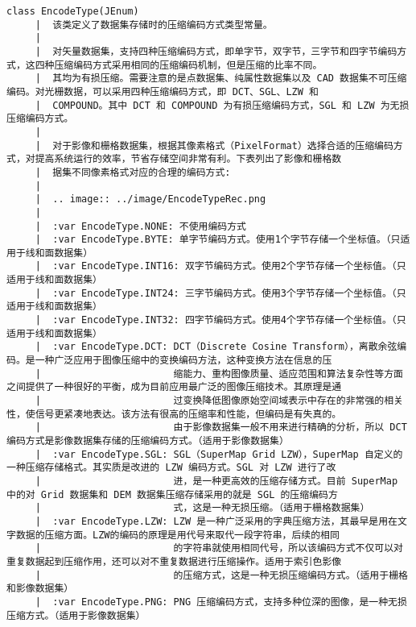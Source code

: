 \documentclass[11pt]{article}
\begin{document}
\begin{Verbatim}[commandchars=\\\{\}]
    class EncodeType(JEnum)
     |  该类定义了数据集存储时的压缩编码方式类型常量。
     |  
     |  对矢量数据集，支持四种压缩编码方式，即单字节，双字节，三字节和四字节编码方式，这四种压缩编码方式采用相同的压缩编码机制，但是压缩的比率不同。
     |  其均为有损压缩。需要注意的是点数据集、纯属性数据集以及 CAD 数据集不可压缩编码。对光栅数据，可以采用四种压缩编码方式，即 DCT、SGL、LZW 和
     |  COMPOUND。其中 DCT 和 COMPOUND 为有损压缩编码方式，SGL 和 LZW 为无损压缩编码方式。
     |  
     |  对于影像和栅格数据集，根据其像素格式（PixelFormat）选择合适的压缩编码方式，对提高系统运行的效率，节省存储空间非常有利。下表列出了影像和栅格数
     |  据集不同像素格式对应的合理的编码方式:
     |  
     |  .. image:: ../image/EncodeTypeRec.png
     |  
     |  :var EncodeType.NONE: 不使用编码方式
     |  :var EncodeType.BYTE: 单字节编码方式。使用1个字节存储一个坐标值。（只适用于线和面数据集）
     |  :var EncodeType.INT16: 双字节编码方式。使用2个字节存储一个坐标值。（只适用于线和面数据集）
     |  :var EncodeType.INT24: 三字节编码方式。使用3个字节存储一个坐标值。（只适用于线和面数据集）
     |  :var EncodeType.INT32: 四字节编码方式。使用4个字节存储一个坐标值。（只适用于线和面数据集）
     |  :var EncodeType.DCT: DCT（Discrete Cosine Transform），离散余弦编码。是一种广泛应用于图像压缩中的变换编码方法，这种变换方法在信息的压
     |                       缩能力、重构图像质量、适应范围和算法复杂性等方面之间提供了一种很好的平衡，成为目前应用最广泛的图像压缩技术。其原理是通
     |                       过变换降低图像原始空间域表示中存在的非常强的相关性，使信号更紧凑地表达。该方法有很高的压缩率和性能，但编码是有失真的。
     |                       由于影像数据集一般不用来进行精确的分析，所以 DCT 编码方式是影像数据集存储的压缩编码方式。（适用于影像数据集）
     |  :var EncodeType.SGL: SGL（SuperMap Grid LZW），SuperMap 自定义的一种压缩存储格式。其实质是改进的 LZW 编码方式。SGL 对 LZW 进行了改
     |                       进，是一种更高效的压缩存储方式。目前 SuperMap 中的对 Grid 数据集和 DEM 数据集压缩存储采用的就是 SGL 的压缩编码方
     |                       式，这是一种无损压缩。（适用于栅格数据集）
     |  :var EncodeType.LZW: LZW 是一种广泛采用的字典压缩方法，其最早是用在文字数据的压缩方面。LZW的编码的原理是用代号来取代一段字符串，后续的相同
     |                       的字符串就使用相同代号，所以该编码方式不仅可以对重复数据起到压缩作用，还可以对不重复数据进行压缩操作。适用于索引色影像
     |                       的压缩方式，这是一种无损压缩编码方式。（适用于栅格和影像数据集）
     |  :var EncodeType.PNG: PNG 压缩编码方式，支持多种位深的图像，是一种无损压缩方式。（适用于影像数据集）

\end{Verbatim}
\end{document}
